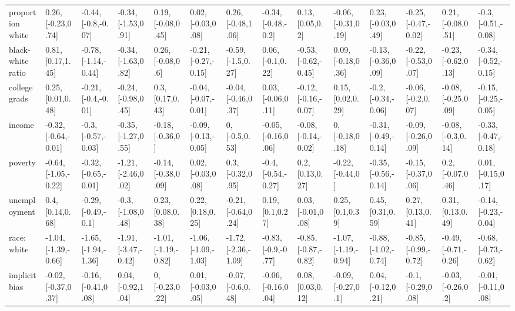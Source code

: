 \documentclass[english,floatsintext,man]{apa6}
\newenvironment{lltable}
  {\begin{landscape}\begin{center}\begin{ThreePartTable}}
  {\end{ThreePartTable}\end{center}\end{landscape}}
\theoremstyle{definition}
\theoremstyle{definition}
\theoremstyle{remark}
\begin{document}
\begin{lltable}
{\begin{longtable}{llllllllllllll}
proportion white & 0.26, [-0.23,0.74] & -0.44, [-0.8,-0.07] & -0.34, [-1.53,0.91] & 0.19, [-0.08,0.45] & 0.02, [-0.03,0.08] & 0.26, [-0.48,1.06] & -0.34, [-0.48,-0.2] & 0.13, [0.05,0.2] & -0.06, [-0.31,0.19] & 0.23, [-0.03,0.49] & -0.25, [-0.47,-0.02] & 0.21, [-0.08,0.51] & -0.3, [-0.51,-0.08]\\
black-white ratio & 0.81, [0.17,1.45] & -0.78, [-1.14,-0.44] & -0.34, [-1.63,0.82] & 0.26, [-0.08,0.6] & -0.21, [-0.27,-0.15] & -0.59, [-1.5,0.27] & 0.06, [-0.1,0.22] & -0.53, [-0.62,-0.45] & 0.09, [-0.18,0.36] & -0.13, [-0.36,0.09] & -0.22, [-0.53,0.07] & -0.23, [-0.62,0.13] & -0.34, [-0.52,-0.15]\\
college grads & 0.25, [0.01,0.48] & -0.21, [-0.4,-0.01] & -0.24, [-0.98,0.45] & 0.3, [0.17,0.43] & -0.04, [-0.07,-0.01] & -0.04, [-0.46,0.37] & 0.03, [-0.06,0.11] & -0.12, [-0.16,-0.07] & 0.15, [0.02,0.29] & -0.2, [-0.34,-0.06] & -0.06, [-0.2,0.07] & -0.08, [-0.25,0.09] & -0.15, [-0.25,-0.05]\\
income & -0.32, [-0.64,-0.01] & -0.3, [-0.57,-0.03] & -0.35, [-1.27,0.55] & -0.18, [-0.36,0] & -0.09, [-0.13,-0.05] & 0, [-0.5,0.53] & -0.05, [-0.16,0.06] & -0.08, [-0.14,-0.02] & 0, [-0.18,0.18] & -0.31, [-0.49,-0.14] & -0.09, [-0.26,0.09] & -0.08, [-0.3,0.14] & -0.33, [-0.47,-0.18]\\
poverty & -0.64, [-1.05,-0.22] & -0.32, [-0.65,-0.01] & -1.21, [-2.46,0.02] & -0.14, [-0.38,0.09] & 0.02, [-0.03,0.08] & 0.3, [-0.32,0.95] & -0.4, [-0.54,-0.27] & 0.2, [0.13,0.27] & -0.22, [-0.44,0] & -0.35, [-0.56,-0.14] & -0.15, [-0.37,0.06] & 0.2, [-0.07,0.46] & 0.01, [-0.15,0.17]\\
unemployment & 0.4, [0.14,0.68] & -0.29, [-0.49,-0.1] & -0.3, [-1.08,0.48] & 0.23, [0.08,0.38] & 0.22, [0.18,0.25] & -0.21, [-0.64,0.24] & 0.19, [0.1,0.27] & 0.03, [-0.01,0.08] & 0.25, [0.1,0.39] & 0.45, [0.31,0.59] & 0.27, [0.13,0.41] & 0.31, [0.13,0.49] & -0.14, [-0.23,-0.04]\\
race: white & -1.04, [-1.39,-0.66] & -1.65, [-1.94,-1.36] & -1.91, [-3.47,-0.42] & -1.01, [-1.19,-0.82] & -1.06, [-1.09,-1.03] & -1.72, [-2.36,-1.09] & -0.83, [-0.9,-0.77] & -0.85, [-0.87,-0.82] & -1.07, [-1.19,-0.94] & -0.88, [-1.02,-0.74] & -0.85, [-0.99,-0.72] & -0.49, [-0.71,-0.26] & -0.68, [-0.73,-0.62]\\
implicit bias & -0.02, [-0.37,0.37] & -0.16, [-0.41,0.08] & 0.04, [-0.92,1.04] & 0, [-0.23,0.22] & 0.01, [-0.03,0.05] & -0.07, [-0.6,0.48] & -0.06, [-0.16,0.04] & 0.08, [0.03,0.12] & -0.09, [-0.27,0.1] & 0.04, [-0.12,0.21] & -0.1, [-0.29,0.08] & -0.03, [-0.26,0.2] & -0.01, [-0.11,0.08]\\

\end{longtable}}
\end{lltable}
\end{document}
